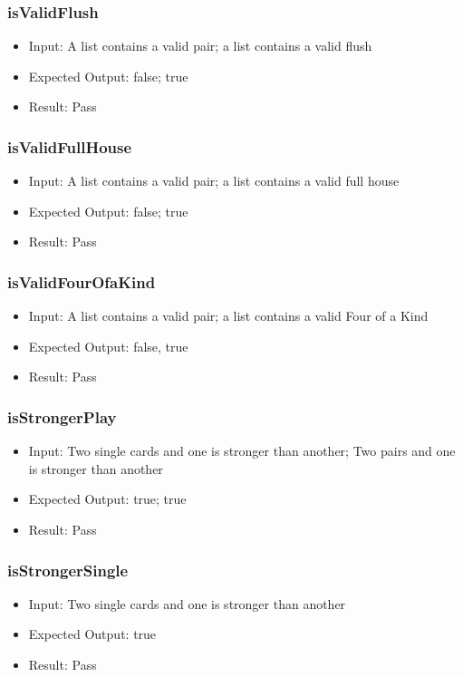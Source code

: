 \documentclass[12pt, titlepage]{article}
\begin{document}
\subsubsection{isValidFlush}
\begin{itemize}
    \item Input: A list contains a valid pair; a list contains a valid flush
    \item Expected Output: false; true
    \item Result: Pass
\end{itemize}

\subsubsection{isValidFullHouse}
\begin{itemize}
    \item Input: A list contains a valid pair; a list contains a valid full house
    \item Expected Output: false; true
    \item Result: Pass
\end{itemize}

\subsubsection{isValidFourOfaKind}
\begin{itemize}
    \item Input: A list contains a valid pair; a list contains a valid Four of a Kind
    \item Expected Output: false, true
    \item Result: Pass
\end{itemize}

\subsubsection{isStrongerPlay}
\begin{itemize}
    \item Input: Two single cards and one is stronger than another; Two pairs and one is stronger than another
    \item Expected Output: true; true
    \item Result: Pass
\end{itemize}

\subsubsection{isStrongerSingle}
\begin{itemize}
    \item Input: Two single cards and one is stronger than another
    \item Expected Output: true
    \item Result: Pass
\end{itemize}
\end{document}

